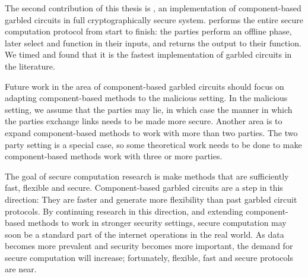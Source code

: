 The second contribution of this thesis is \CompGC, an implementation of component-based garbled circuits in full cryptographically secure system.
\CompGC performs the entire secure computation protocol from start to finish: the parties perform an offline phase, later select and function in their inputs, and \CompGC returns the output to their function. 
We timed \CompGC and found that it is the fastest implementation of garbled circuits in the literature.

Future work in the area of component-based garbled circuits should focus on adapting component-based methods to the malicious setting.
In the malicious setting, we assume that the parties may lie, in which case the manner in which the parties exchange links needs to be made more secure.
Another area is to expand component-based methods to work with more than two parties.
The two party setting is a special case, so some theoretical work needs to be done to make component-based methods work with three or more parties.

The goal of secure computation research is make methods that are sufficiently fast, flexible and secure.
Component-based garbled circuits are a step in this direction: They are faster and generate more flexibility than past garbled circuit protocols.
By continuing research in this direction, and extending component-based methods to work in stronger security settings, secure computation may soon be a standard part of the internet operations in the real world.
As data becomes more prevalent and security becomes more important, the demand for secure computation will increase; fortunately, flexible, fast and secure protocols are near.
